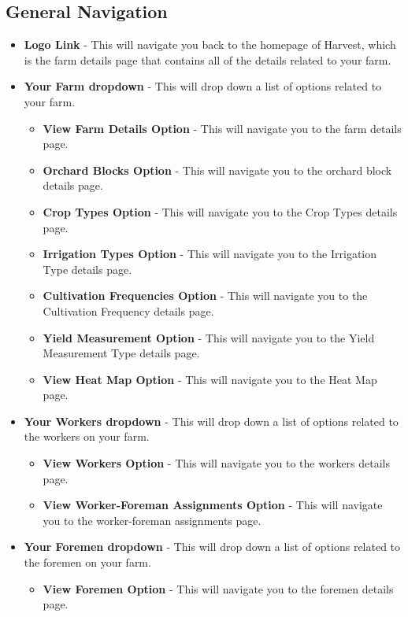 \documentclass[11pt,fleqn]{book} %
\begin{document}
		\subsection{General Navigation}
		\begin{itemize}
			\item \textbf{Logo Link} - This will navigate you back to the homepage of Harvest, which is the farm details page that contains all of the details related to your farm.
			\item \textbf{Your Farm dropdown} - This will drop down a list of options related to your farm.
			\begin{itemize}
				\item \textbf{View Farm Details Option} - This will navigate you to the farm details page.
				\item \textbf{Orchard Blocks Option} - This will navigate you to the orchard block details page.
				\item \textbf{Crop Types Option} - This will navigate you to the Crop Types details page.
				\item \textbf{Irrigation Types Option} - This will navigate you to the Irrigation Type details page.
				\item \textbf{Cultivation Frequencies Option} - This will navigate you to the Cultivation Frequency details page.
				\item \textbf{Yield Measurement Option} - This will navigate you to the Yield Measurement Type details page.
				\item \textbf{View Heat Map Option} - This will navigate you to the Heat Map page.
			\end{itemize}
			\item \textbf{Your Workers dropdown} - This will drop down a list of options related to the workers on your farm.
			\begin{itemize}
				\item \textbf{View Workers Option} - This will navigate you to the workers details page.
				\item \textbf{View Worker-Foreman Assignments Option} - This will navigate you to the worker-foreman assignments page.
			\end{itemize}
			\item \textbf{Your Foremen dropdown} - This will drop down a list of options related to the foremen on your farm.
			\begin{itemize}
				\item \textbf{View Foremen Option} - This will navigate you to the foremen details page.

\end{itemize}
\end{itemize}
\end{document}
